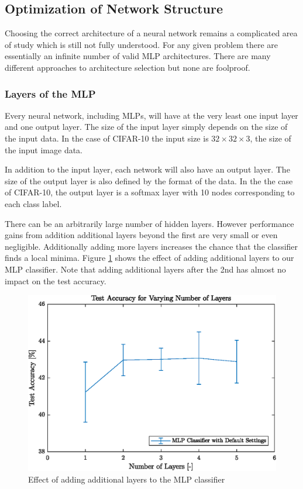 \subsection{Optimization of Network Structure}\label{subsec:netStruct}

Choosing the correct architecture of a neural network remains a complicated area of study which is still not fully understood\cite{andersen1999cross}. For any given problem there are essentially an infinite number of valid MLP architectures. There are many different approaches to architecture selection but none are foolproof\cite{andersen1999cross}.

\subsubsection{Layers of the MLP}

Every neural network, including MLPs, will have at the very least one input layer and one output layer. The size of the input layer simply depends on the size of the input data. In the case of CIFAR-10 the input size is $32\times32\times3$, the size of the input image data.

In addition to the input layer, each network will also have an output layer. The size of the output layer is also defined by the format of the data. In the the case of CIFAR-10, the output layer is a softmax layer with 10 nodes corresponding to each class label.

There can be an arbitrarily large number of hidden layers. However performance gains from addition additional layers beyond the first are very small or even negligible. Additionally adding more layers increases the chance that the classifier finds a local minima\cite{de1993backpropagation}. Figure \ref{fig:layers} shows the effect of adding additional layers to our MLP classifier. Note that adding additional layers after the 2nd has almost no impact on the test accuracy.

\begin{figure}[h!]
    \centering
    \includegraphics{images/numberlayers}
    \caption{Effect of adding additional layers to the MLP classifier}
    \label{fig:layers}
 \end{figure}

